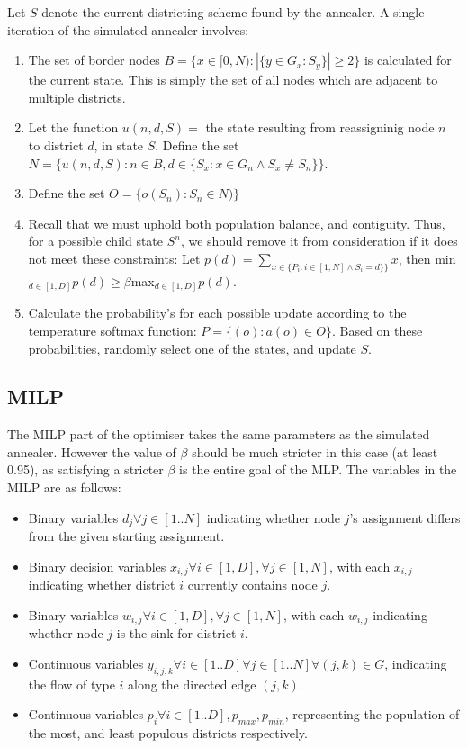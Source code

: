 \documentclass{article}
\begin{document}
Let $S$ denote the current districting scheme found by the annealer. A single
iteration of the simulated annealer involves:
\begin{enumerate}
	\item The set of border nodes $B=\{x\in[0, N): |\{y\in G_x: S_y\}|\geq2\}$ is
	      calculated for the current state. This is simply the set of all nodes which are
	      adjacent to multiple districts.
	\item Let the function $u(n, d, S)=$ the state resulting from reassigninig node $n$
	      to district $d$, in state $S$. Define the set $N = \{u(n, d, S): n \in B, d\in
		      \{S_x: x\in G_n\land S_x\neq S_n\}\}$.
	\item Define the set $O = \{o(S_n): S_n\in N)\}$
	\item Recall that we must uphold both population balance, and contiguity. Thus, for a
	      possible child state $S^n$, we should remove it from consideration if it does
	      not meet these constraints: Let $p(d) = \sum_{x\in \{P_i: i\in[1,N]\land
			      S_i=d\}\}}x$, then min$_{d\in[1,D]}p(d)\geq \beta$max$_{d\in[1,D]}p(d)$.
	\item Calculate the probability's for each possible update according to the
	      temperature softmax function: $P=\{(o): a(o)\in O\}$. Based on these
	      probabilities, randomly select one of the states, and update $S$.
\end{enumerate}

\subsection{MILP}
The MILP part of the optimiser takes the same parameters as the simulated
annealer. However the value of $\beta$ should be much stricter in this case (at
least 0.95), as satisfying a stricter $\beta$ is the entire goal of the MLP.
The variables in the MILP are as follows:
\begin{itemize}
	\item Binary variables $d_j \forall j\in[1..N]$ indicating whether node $j$'s
	      assignment differs from the given starting assignment.
	\item Binary decision variables $x_{i,j} \forall i\in[1,D], \forall j\in[1,N]$, with
	      each $x_{i,j}$ indicating whether district $i$ currently contains node $j$.
	\item Binary variables $w_{i,j} \forall i\in[1,D], \forall j\in[1,N]$, with each
	      $w_{i,j}$ indicating whether node $j$ is the sink for district $i$.
	\item Continuous variables $y_{i,j,k} \forall i\in[1..D] \forall j\in[1..N] \forall
		      (j,k)\in G$, indicating the flow of type $i$ along the directed edge $(j,k)$.
	\item Continuous variables $p_i\forall i\in[1..D], p_{max}, p_{min}$, representing
	      the population of the most, and least populous districts respectively.
\end{itemize}
\end{document}
